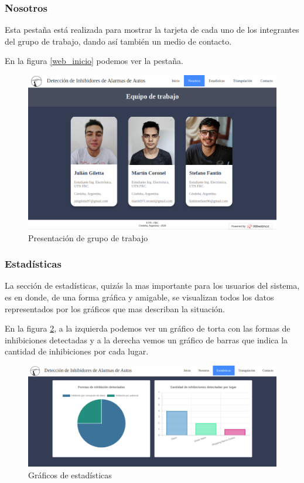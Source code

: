 \subsubsection{Nosotros}
Esta pestaña está realizada para mostrar la tarjeta de cada uno de los integrantes del grupo de trabajo, dando así también un medio de contacto.
\par En la figura \ref{web_inicio} podemos ver la pestaña. 
\begin{figure}[h!]
	\centering
	\includegraphics[scale=0.3]{images/web/nosotros-web.png}
    \caption{Presentación de grupo de trabajo}
	\label{web_nos}
\end{figure}
\subsubsection{Estadísticas}
La sección de estadísticas, quizás la mas importante para los usuarios del sistema, es en donde, de una forma gráfica y amigable, se visualizan todos los datos representados por los gráficos que mas describan la situación. 
\par En la figura \ref{web_est}, a la izquierda podemos ver un gráfico de torta con las formas de inhibiciones detectadas y a la derecha vemos un gráfico de barras que indica la cantidad de inhibiciones por cada lugar. 
\begin{figure}[h!]
	\centering
	\includegraphics[scale=0.3]{images/web/est-web.png}
    \caption{Gráficos de estadísticas}
	\label{web_est}
\end{figure}
